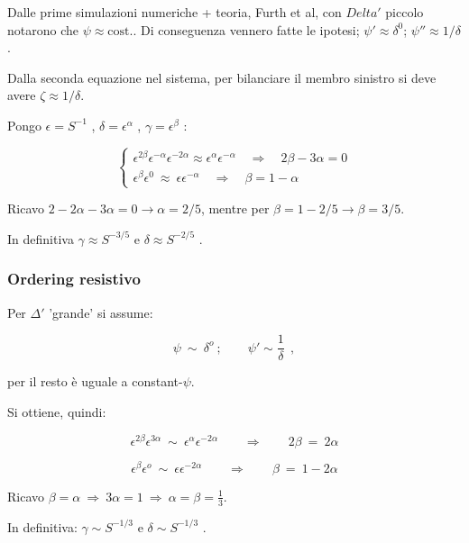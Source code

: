 Dalle prime simulazioni numeriche + teoria, Furth et al, con $Delta '$ piccolo notarono che $\psi \approx \text{cost.}.$
Di conseguenza vennero fatte le ipotesi; $\psi '\approx \delta^0$; $\psi ''\approx 1/\delta$ .

Dalla seconda equazione nel sistema, per bilanciare il membro sinistro si deve avere $\zeta\approx 1/\delta$.

Pongo $\epsilon = S^{-1}$ , $\delta =\epsilon^\alpha$ , $\gamma =\epsilon^\beta$ :

\[\begin{cases}
	\epsilon^{2\beta} \epsilon^{-\alpha} \epsilon^{-2\alpha}\approx \epsilon^{\alpha}\epsilon^{-\alpha}\quad \Rightarrow\quad 2\beta -3\alpha =0\\
	\epsilon^\beta \epsilon^0\ \approx\ \epsilon\epsilon^{-\alpha}\quad \Rightarrow\quad \beta= 1-\alpha 
\end{cases}\]

Ricavo $2-2\alpha - 3\alpha = 0 \rightarrow \alpha=2/5$, mentre per $\beta=1-2/5\rightarrow\beta=3/5$.

In definitiva $\gamma \approx S^{-3/5}$ e $\delta \approx S^{-2/5}$ .

 

%
\subsubsection{Ordering resistivo}

Per $\Delta '$ 'grande' si assume:

\[ \psi\ \sim\ \delta^o\ ;\qquad \psi '\sim \frac{1}{\delta}\ \ ,\]

per il resto è uguale a constant-$\psi$.

Si ottiene, quindi:

\[\epsilon^{2\beta}\epsilon^{3\alpha}\ \sim\ \epsilon^{\alpha} \epsilon^{-2\alpha} 
\qquad \Rightarrow \qquad 2\beta \ =\ 2 \alpha\]

\[\epsilon^{\beta}\epsilon^o \ \sim\ \epsilon \epsilon^{-2\alpha}
\qquad \Rightarrow \qquad \beta \ =\ 1 - 2 \alpha\]

Ricavo $\beta = \alpha \ \Rightarrow\ 3\alpha = 1\ \Rightarrow\ \alpha = \beta = \frac{1}{3}$.

In definitiva: $\gamma \sim S^{-1/3}$ e $\delta \sim S^{-1/3}$ .





























